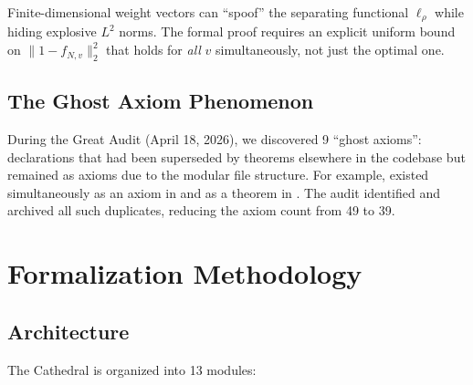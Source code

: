 \documentclass[11pt,a4paper]{article}
\begin{document}
Finite-dimensional weight vectors can ``spoof'' the separating
functional $\ell_\rho$ while hiding explosive $L^2$ norms. The formal
proof requires an explicit uniform bound on $\|1 - f_{N,v}\|_2^2$
that holds for \emph{all} $v$ simultaneously, not just the optimal one.

\subsection{The Ghost Axiom Phenomenon}

During the Great Audit (April 18, 2026), we discovered 9 ``ghost axioms'':
declarations that had been superseded by theorems elsewhere in the codebase
but remained as axioms due to the modular file structure. For example,
 existed simultaneously as an axiom in
 and as a theorem in
. The audit identified and archived all
such duplicates, reducing the axiom count from 49 to 39.

\section{Formalization Methodology}
\label{sec:methodology}

\subsection{Architecture}

The Cathedral is organized into 13 modules:
\end{document}
